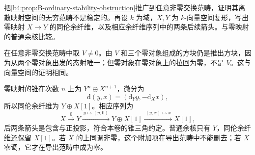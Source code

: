 \begin{exercise}\label{b4:ex:B-ordinary-not-stable}
	把\cref{b4:prop:B-ordinary-stability-obstruction}推广到任意非零交换范畴，证明其离散映射空间的无穷范畴不是稳定的。再设 \(k\) 为域，\(X,Y\) 为 \(k\)-向量空间复形，写出零映射 \(X\to Y\) 的同伦余纤维，以及相应余纤维序列中的两条后续箭头。与零映射的普通余核比较。
\end{exercise}
\begin{solution}
	在任意非零交换范畴中取 \(V\ne0\)。由 \(V\) 和三个零对象组成的方块仍是推出方块，因为从两个零对象出发的态射唯一；但零对象在零对象上的拉回为零，不是 \(V\)。这与向量空间的证明相同。

	零映射的锥在次数 \(n\) 上为 \(Y^n\oplus X^{n+1}\)，微分为
	\[
		\mathrm d(y,x)=(\mathrm d_Yy,-\mathrm d_Xx),
	\]
	所以同伦余纤维为 \(Y\oplus X[1]\)。相应序列为
	\[
		X\xrightarrow{0}Y\xrightarrow{\ y\mapsto(y,0)\ } Y\oplus X[1]\xrightarrow{\ (y,x)\mapsto x\ }X[1],
	\]
	后两条箭头是包含与正投影，符合本卷的锥三角约定。普通余核只有 \(Y\)，同伦余纤维还保留 \(X[1]\)。若 \(X\) 的上同调非零，这个附加项在导出范畴中不能删去；若 \(X\) 零调，它才在导出范畴中成为零。
\end{solution}
